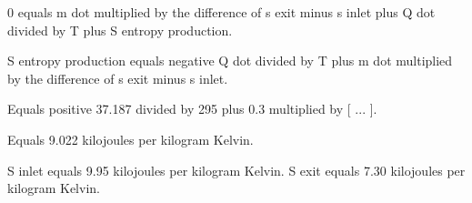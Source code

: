 0 equals m dot multiplied by the difference of s exit minus s inlet plus Q dot divided by T plus S entropy production.  

S entropy production equals negative Q dot divided by T plus m dot multiplied by the difference of s exit minus s inlet.  

Equals positive 37.187 divided by 295 plus 0.3 multiplied by [ ... ].  

Equals 9.022 kilojoules per kilogram Kelvin.  

S inlet equals 9.95 kilojoules per kilogram Kelvin.  
S exit equals 7.30 kilojoules per kilogram Kelvin.